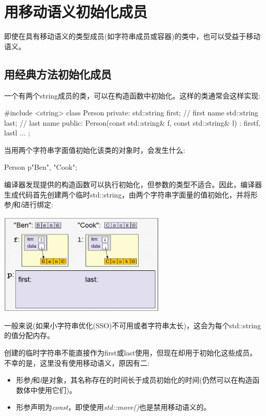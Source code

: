 \section{用移动语义初始化成员}
即使在具有移动语义的类型成员(如字符串成员或容器)的类中，也可以受益于移动语义。

\subsection{用经典方法初始化成员}

一个有两个string成员的类，可以在构造函数中初始化。这样的类通常会这样实现:

\begin{cppcode}
#include <string>
class Person {
private:
	std::string first; // first name
	std::string last; // last name
public:
	Person(const std::string& f, const std::string& l)
	: first{f}, last{l} {
	}
	...
};
\end{cppcode}

当用两个字符串字面值初始化该类的对象时，会发生什么:

\begin{cppcode}
Person p{"Ben", "Cook"};
\end{cppcode}

编译器发现提供的构造函数可以执行初始化，但参数的类型不适合。因此，编译器生成代码首先创建两个临时std::string，由两个字符串字面量的值初始化，并将形参\textit{f}和\textit{l}进行绑定:

\begin{center}
	\includegraphics[width=0.6\textwidth]{part1/ch4/images/1}
\end{center}

一般来说(如果小字符串优化(SSO)不可用或者字符串太长)，这会为每个std::string的值分配内存。

创建的临时字符串不能直接作为first或last使用，但现在却用于初始化这些成员。不幸的是，这里没有使用移动语义，原因有二:

\begin{itemize}
	\item 形参\textit{f}和\textit{l}是对象，其名称存在的时间长于成员初始化的时间(仍然可以在构造函数体中使用它们)。
	\item 形参声明为\textit{const}，即使使用\textit{std::move()}也是禁用移动语义的。
\end{itemize}

